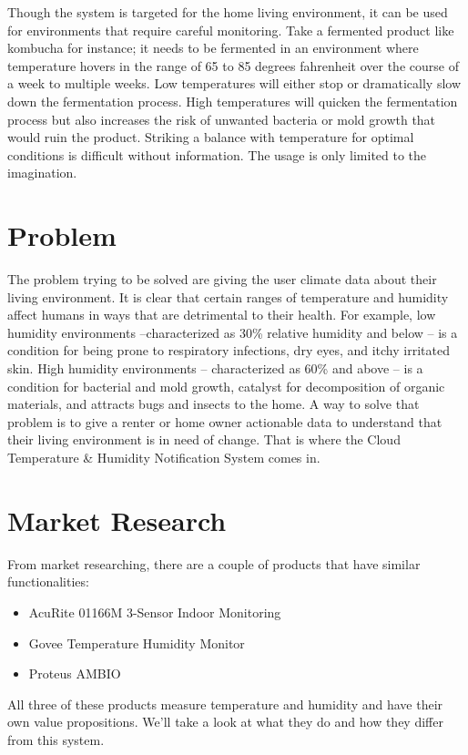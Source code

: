 \documentclass{article}
\begin{document}
Though the system is targeted for the home living environment, it can be used for environments that require careful monitoring. Take a fermented product like kombucha for instance; it needs to be fermented in an environment where temperature hovers in the range of 65 to 85 degrees fahrenheit over the course of a week to multiple weeks. Low temperatures will either stop or dramatically slow down the fermentation process. High temperatures will quicken the fermentation process but also increases the risk of unwanted bacteria or mold growth that would ruin the product. Striking a balance with temperature for optimal conditions is difficult without information. The usage is only limited to the imagination.

\section{Problem}
The problem trying to be solved are giving the user climate data about their living environment. It is clear that certain ranges of temperature and humidity affect humans in ways that are detrimental to their health. For example, low humidity environments --characterized as 30\% relative humidity and below -- is a condition for being prone to respiratory infections, dry eyes, and itchy irritated skin. High humidity environments -- characterized as 60\% and above -- is a condition for bacterial and mold growth, catalyst for decomposition of organic materials, and attracts bugs and insects to the home. A way to solve that problem is to give a renter or home owner actionable data to understand that their living environment is in need of change. That is where the Cloud Temperature \& Humidity Notification System comes in.

\section{Market Research}
From market researching, there are a couple of products that have similar functionalities:

\begin{itemize}
	\item AcuRite 01166M 3-Sensor Indoor Monitoring
	\item Govee Temperature Humidity Monitor
	\item Proteus AMBIO
\end{itemize}

All three of these products measure temperature and humidity and have their own value propositions. We'll take a look at what they do and how they differ from this system.
\end{document}
